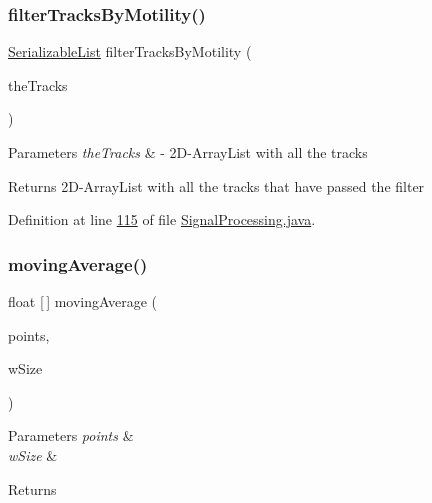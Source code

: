 \subsubsection{\texorpdfstring{filter\+Tracks\+By\+Motility()}{filterTracksByMotility()}}
{\footnotesize\ttfamily \hyperlink{classdata_1_1_serializable_list}{Serializable\+List} filter\+Tracks\+By\+Motility (\begin{DoxyParamCaption}\item[{\hyperlink{classdata_1_1_serializable_list}{Serializable\+List}}]{the\+Tracks }\end{DoxyParamCaption})}


\begin{DoxyParams}{Parameters}
{\em the\+Tracks} & -\/ 2\+D-\/\+Array\+List with all the tracks \\
\hline
\end{DoxyParams}
\begin{DoxyReturn}{Returns}
2\+D-\/\+Array\+List with all the tracks that have passed the filter 
\end{DoxyReturn}


Definition at line \hyperlink{_signal_processing_8java_source_l00115}{115} of file \hyperlink{_signal_processing_8java_source}{Signal\+Processing.\+java}.

\hypertarget{classfunctions_1_1_signal_processing_a4f10245c50d850b87d1ef4d81c28300d}{}\label{classfunctions_1_1_signal_processing_a4f10245c50d850b87d1ef4d81c28300d} 
\subsubsection{\texorpdfstring{moving\+Average()}{movingAverage()}\hspace{0.1cm}{\footnotesize\ttfamily [1/3]}}
{\footnotesize\ttfamily float \mbox{[}$\,$\mbox{]} moving\+Average (\begin{DoxyParamCaption}\item[{float \mbox{[}$\,$\mbox{]}}]{points,  }\item[{int}]{w\+Size }\end{DoxyParamCaption})}


\begin{DoxyParams}{Parameters}
{\em points} & \\
\hline
{\em w\+Size} & \\
\hline
\end{DoxyParams}
\begin{DoxyReturn}{Returns}

\end{DoxyReturn}


